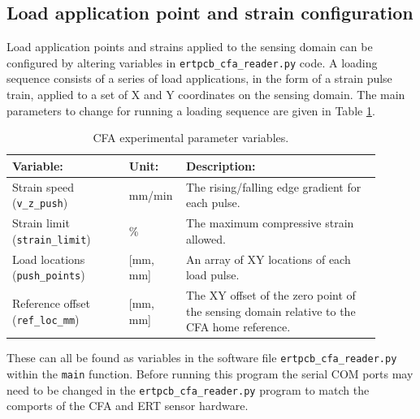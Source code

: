 \subsection{Load application point and strain configuration}
Load application points and strains applied to the sensing domain can be configured by altering variables in \verb|ertpcb_cfa_reader.py| code. A loading sequence consists of a series of load applications, in the form of a strain pulse train, applied to a set of X and Y coordinates on the sensing domain. The main parameters to change for running a loading sequence are given in Table \ref{tab:ert_cfa_params}.
\begin{table}[H]
	\caption{CFA experimental parameter variables.}
	\label{tab:ert_cfa_params}
	\begin{tabular}{|p{0.3\linewidth}|p{0.1\linewidth}|p{0.5\linewidth}|}
		\hline
		\textbf{Variable:}  & \textbf{Unit:} & \textbf{Description:} \\ \hline
		Strain speed (\texttt{v\_z\_push}) & mm/min & The rising/falling edge gradient for each pulse. \\ \hline
		Strain limit (\texttt{strain\_limit}) & \% & The maximum compressive strain allowed. \\ \hline
		Load locations (\texttt{push\_points}) & [mm, mm] & An array of XY locations of each load pulse. \\ \hline
		Reference offset (\texttt{ref\_loc\_mm}) & [mm, mm] & The XY offset of the zero point of the sensing domain relative to the CFA home reference. \\ \hline
	\end{tabular}
\end{table}
These can all be found as variables in the software file \verb|ertpcb_cfa_reader.py| within the \verb|main| function. Before running this program the serial COM ports may need to be changed in the \verb|ertpcb_cfa_reader.py| program to match the comports of the CFA and ERT sensor hardware.

